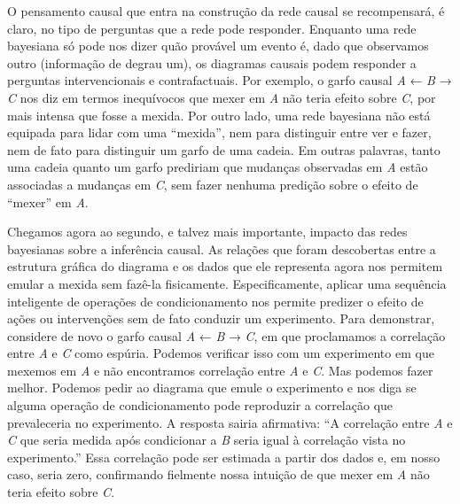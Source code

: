 \documentclass[11pt,a5paper,twoside]{book}
\begin{document}
O pensamento causal que entra na construção da rede causal se recompensará, é claro, no tipo de perguntas que a rede pode responder. Enquanto uma rede bayesiana só pode nos dizer quão provável um evento é, dado que observamos outro (informação de degrau um), os diagramas causais podem responder a perguntas intervencionais e contrafactuais. Por exemplo, o garfo causal \textit{A} ← \textit{B} → \textit{C} nos diz em termos inequívocos que mexer em \textit{A} não teria efeito sobre \textit{C}, por mais intensa que fosse a mexida. Por outro lado, uma rede bayesiana não está equipada para lidar com uma “mexida”, nem para distinguir entre ver e fazer, nem de fato para distinguir um garfo de uma cadeia. Em outras palavras, tanto uma cadeia quanto um garfo prediriam que mudanças observadas em \textit{A} estão associadas a mudanças em \textit{C}, sem fazer nenhuma predição sobre o efeito de “mexer” em \textit{A}.

Chegamos agora ao segundo, e talvez mais importante, impacto das redes bayesianas sobre a inferência causal. As relações que foram descobertas entre a estrutura gráfica do diagrama e os dados que ele representa agora nos permitem emular a mexida sem fazê-la fisicamente. Especificamente, aplicar uma sequência inteligente de operações de condicionamento nos permite predizer o efeito de ações ou intervenções sem de fato conduzir um experimento. Para demonstrar, considere de novo o garfo causal \textit{A} ← \textit{B} → \textit{C}, em que proclamamos a correlação entre \textit{A} e \textit{C} como espúria. Podemos verificar isso com um experimento em que mexemos em \textit{A} e não encontramos correlação entre \textit{A} e \textit{C}. Mas podemos fazer melhor. Podemos pedir ao diagrama que emule o experimento e nos diga se alguma operação de condicionamento pode reproduzir a correlação que prevaleceria no experimento. A resposta sairia afirmativa: “A correlação entre \textit{A} e \textit{C} que seria medida após condicionar a \textit{B} seria igual à correlação vista no experimento.” Essa correlação pode ser estimada a partir dos dados e, em nosso caso, seria zero, confirmando fielmente nossa intuição de que mexer em \textit{A} não teria efeito sobre \textit{C}.
\end{document}
